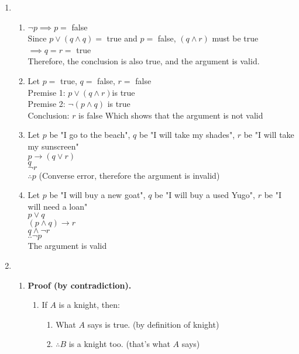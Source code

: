 \documentclass[12pt, a4paper]{article}
\begin{document}
\begin{enumerate}[Q\arabic*.]
  \item
    \begin{enumerate}[(\alph*)]
      \item $\neg p \implies p =$ false \\
        Since $p \lor (q \land q) =$ true and $p =$ false, $(q \land r)$ must be true $\implies q = r =$ true \\
        Therefore, the conclusion is also true, and the argument is valid.
      \item Let $p =$ true, $q =$ false, $r =$ false \\
        Premise 1: $p \lor (q \land r) $is true\\
        Premise 2: $\neg(p \land q)$ is true\\
        Conclusion: $r$ is false
        Which shows that the argument is not valid
      \item Let $p$ be "I go to the beach", $q$ be "I will take my shades", $r$ be "I will take my sunscreen"\\
        $p \rightarrow (q \lor r)$\\
        $q$\\
        $\neg r$\\
        $\therefore p$ (Converse error, therefore the argument is invalid)
      \item Let $p$ be "I will buy a new goat", $q$ be "I will buy a used Yugo", $r$ be "I will need a loan"\\
        $p \lor q$\\
        $(p \land q) \rightarrow r$\\
        $q \land \neg r$\\
        $\therefore \neg p$ \\
        The argument is valid
    \end{enumerate}
  \item \begin{enumerate}[(\alph*)]
      \item \textbf{Proof (by contradiction).}
      \begin{enumerate}[label=\arabic*., itemsep=-2em]
          \item If $A$ is a knight, then:
            \begin{enumerate}[label=1.\arabic*, itemsep=-2em]
              \item What $A$ says is true. \hfill (by definition of knight)
              \item $\therefore B$ is a knight too. \hfill (that's what $A$ says)

\end{enumerate}
\end{enumerate}
\end{enumerate}
\end{enumerate}
\end{document}
